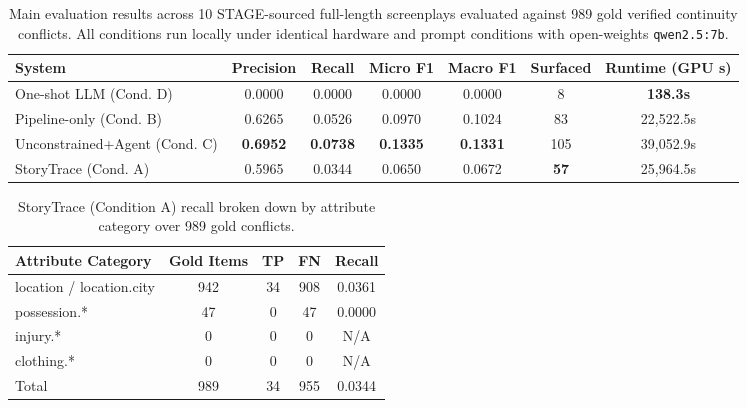 
\begin{table}[h]
\centering
\begin{tabular}{lcccccc}
\hline
System & Precision & Recall & Micro F1 & Macro F1 & Surfaced & Runtime (GPU s) \\
\hline
One-shot LLM (Cond. D) & 0.0000 & 0.0000 & 0.0000 & 0.0000 & 8 & \textbf{138.3s} \\
Pipeline-only (Cond. B) & 0.6265 & 0.0526 & 0.0970 & 0.1024 & 83 & 22,522.5s \\
Unconstrained+Agent (Cond. C) & \textbf{0.6952} & \textbf{0.0738} & \textbf{0.1335} & \textbf{0.1331} & 105 & 39,052.9s \\
StoryTrace (Cond. A) & 0.5965 & 0.0344 & 0.0650 & 0.0672 & \textbf{57} & 25,964.5s \\
\hline
\end{tabular}
\caption{Main evaluation results across 10 STAGE-sourced full-length screenplays evaluated against 989 gold verified continuity conflicts. All conditions run locally under identical hardware and prompt conditions with open-weights \texttt{qwen2.5:7b}.}
\label{tab:main-results}
\end{table}

\begin{table}[h]
\centering
\begin{tabular}{lcccc}
\hline
Attribute Category & Gold Items & TP & FN & Recall \\
\hline
location / location.city & 942 & 34 & 908 & 0.0361 \\
possession.* & 47 & 0 & 47 & 0.0000 \\
injury.* & 0 & 0 & 0 & N/A \\
clothing.* & 0 & 0 & 0 & N/A \\
\hline
Total & 989 & 34 & 955 & 0.0344 \\
\hline
\end{tabular}
\caption{StoryTrace (Condition A) recall broken down by attribute category over 989 gold conflicts.}
\label{tab:entity-breakdown}
\end{table}

